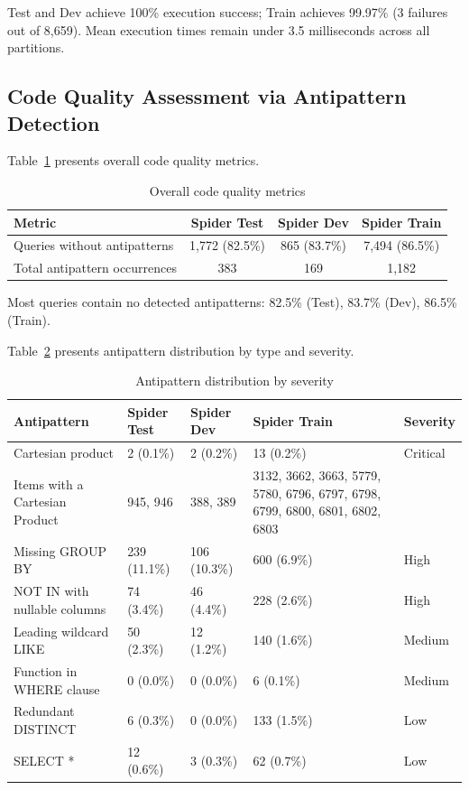 \documentclass[print]{einformatica}
\begin{document}
Test and Dev achieve 100\% execution success; Train achieves 99.97\% (3 failures out of 8,659). Mean execution times remain under 3.5 milliseconds across all partitions.

\subsection{Code Quality Assessment via Antipattern Detection}\label{sec:antipattern_results}

Table~\ref{tab:antipatterns_overall} presents overall code quality metrics.

\begin{table}[ht]
    \caption{Overall code quality metrics}
    \label{tab:antipatterns_overall}
    \centering
    \footnotesize
    \begin{tabular}{lccc}
        \toprule
        \textbf{Metric} & \textbf{Spider Test} & \textbf{Spider Dev} & \textbf{Spider Train} \\
        \midrule
        Queries without antipatterns & 1,772 (82.5\%) & 865 (83.7\%) & 7,494 (86.5\%) \\
        Total antipattern occurrences & 383 & 169 & 1,182 \\
        \bottomrule
    \end{tabular}
\end{table}

Most queries contain no detected antipatterns: 82.5\% (Test), 83.7\% (Dev), 86.5\% (Train).

Table~\ref{tab:antipatterns_top5} presents antipattern distribution by type and severity.

\begin{table}[ht]
    \caption{Antipattern distribution by severity}
    \label{tab:antipatterns_top5}
    \centering
    \footnotesize
    \begin{tabular}{lp{}p{}p{}l}
        \toprule
        \textbf{Antipattern} & \textbf{Spider Test} & \textbf{Spider Dev} & \textbf{Spider Train} & \textbf{Severity} \\
        \midrule
        Cartesian product & 2 (0.1\%) & 2 (0.2\%) & 13 (0.2\%) & Critical \\
        Items with a Cartesian Product & 945, 946 & 388, 389 & 3132, 3662, 3663, 5779, 5780, 6796, 6797, 6798, 6799, 6800, 6801, 6802, 6803 & \\
        Missing GROUP BY & 239 (11.1\%) & 106 (10.3\%) & 600 (6.9\%) & High \\
        NOT IN with nullable columns & 74 (3.4\%) & 46 (4.4\%) & 228 (2.6\%) & High \\
        Leading wildcard LIKE & 50 (2.3\%) & 12 (1.2\%) & 140 (1.6\%) & Medium \\
        Function in WHERE clause & 0 (0.0\%) & 0 (0.0\%) & 6 (0.1\%) & Medium \\
        Redundant DISTINCT & 6 (0.3\%) & 0 (0.0\%) & 133 (1.5\%) & Low \\
        SELECT * & 12 (0.6\%) & 3 (0.3\%) & 62 (0.7\%) & Low \\
        \bottomrule
    \end{tabular}
\end{table}
\end{document}
